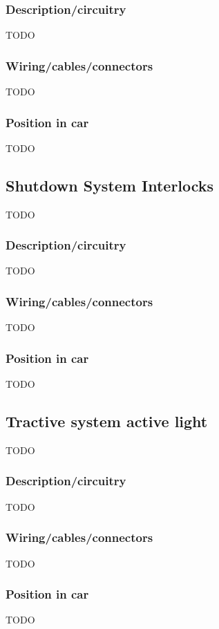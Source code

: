 \documentclass{article}
\begin{document}
\subsubsection{Description/circuitry}
TODO

\subsubsection{Wiring/cables/connectors}
TODO

\subsubsection{Position in car}
TODO

\subsection{Shutdown System Interlocks}
TODO

\subsubsection{Description/circuitry}
TODO

\subsubsection{Wiring/cables/connectors}
TODO

\subsubsection{Position in car}
TODO

\subsection{Tractive system active light}
TODO

\subsubsection{Description/circuitry}
TODO

\subsubsection{Wiring/cables/connectors}
TODO

\subsubsection{Position in car}
TODO
\end{document}
